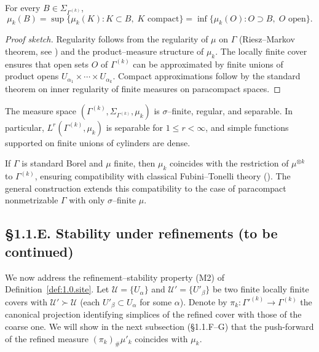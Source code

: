 \begin{lemma}\label{lem:1.1.reg}
For every $B\in\Sigma_{\Gamma^{(k)}}$,
\[
\mu_k(B)=\sup\{\mu_k(K): K\subset B,\; K\text{ compact}\}
          =\inf\{\mu_k(O): O\supset B,\; O\text{ open}\}.
\]
\end{lemma}

\begin{proof}[Proof sketch]
Regularity follows from the regularity of $\mu$ on $\Gamma$ (Riesz–Markov theorem, see \cite[Th.\,7.8.1]{Bogachev1}) and the product–measure structure of $\mu_k$. 
The locally finite cover ensures that open sets $O$ of $\Gamma^{(k)}$ can be approximated by finite unions of product opens $U_{\alpha_1}\times\cdots\times U_{\alpha_k}$.
Compact approximations follow by the standard theorem on inner regularity of finite measures on paracompact spaces.
\end{proof}

\begin{corollary}
The measure space $(\Gamma^{(k)},\Sigma_{\Gamma^{(k)}},\mu_k)$ is $\sigma$–finite, regular, and separable. 
In particular, $L^r(\Gamma^{(k)},\mu_k)$ is separable for $1\le r<\infty$, and simple functions supported on finite unions of cylinders are dense.
\end{corollary}

\begin{remark}
If $\Gamma$ is standard Borel and $\mu$ finite, then $\mu_k$ coincides with the restriction of $\mu^{\otimes k}$ to $\Gamma^{(k)}$, ensuring compatibility with classical Fubini–Tonelli theory (\cite{Halmos, Bogachev1}).
The general construction extends this compatibility to the case of paracompact nonmetrizable $\Gamma$ with only $\sigma$–finite $\mu$.
\end{remark}

\subsection*{§1.1.E. Stability under refinements (to be continued)}
We now address the refinement–stability property (M2) of Definition~\ref{def:1.0.site}.
Let $\mathcal U=\{U_\alpha\}$ and $\mathcal U'=\{U'_\beta\}$ be two finite locally finite covers with $\mathcal U'\succ\mathcal U$ (each $U'_\beta\subset U_\alpha$ for some $\alpha$).
Denote by $\pi_k:\Gamma'^{(k)}\to\Gamma^{(k)}$ the canonical projection identifying simplices of the refined cover with those of the coarse one.
We will show in the next subsection (§1.1.F–G) that the push-forward of the refined measure $(\pi_k)_\#\mu'_k$ coincides with $\mu_k$.

